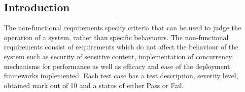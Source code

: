 \subsection{Introduction}
The non-functional requirements specify criteria that can be used to judge the operation of a system, rather than specific behaviours. The non-functional requirements consist of requirements which do not affect the behaviour of the system such as security of sensitive content, implementation of concurrency mechanisms for performance as well as efficacy and ease of the deployment frameworks implemented. Each test case has a test description, severity level, obtained mark out of 10 and a status of either Pass or Fail.
